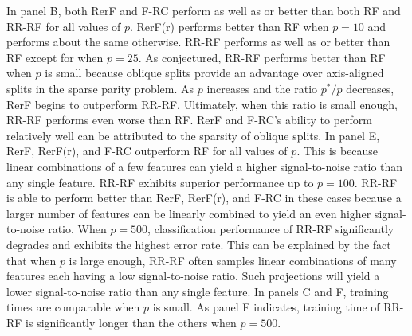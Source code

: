 In panel B, both RerF and F-RC perform as well as or better than both RF and RR-RF for all values of $p$. RerF(r) performs better than RF when $p = 10$ and performs about the same otherwise. RR-RF performs as well as or better than RF except for when $p = 25$. As conjectured, RR-RF performs better than RF when $p$ is small because oblique splits provide an advantage over axis-aligned splits in the sparse parity problem. As $p$ increases and the ratio $p^*/p$ decreases, RerF begins to outperform RR-RF. Ultimately, when this ratio is small enough, RR-RF performs even worse than RF. RerF and F-RC's ability to perform relatively well can be attributed to the sparsity of oblique splits. In panel E, RerF, RerF(r), and F-RC outperform RF for all values of $p$. This is because linear combinations of a few features can yield a higher signal-to-noise ratio than any single feature. RR-RF exhibits superior performance up to $p = 100$. RR-RF is able to perform better than RerF, RerF(r), and F-RC in these cases because a larger number of features can be linearly combined to yield an even higher signal-to-noise ratio. When $p = 500$, classification performance of RR-RF significantly degrades and exhibits the highest error rate. This can be explained by the fact that when $p$ is large enough, RR-RF often samples linear combinations of many features each having a low signal-to-noise ratio. Such projections will yield a lower signal-to-noise ratio than any single feature. In panels C and F, training times are comparable when $p$ is small. As panel F indicates, training time of RR-RF is significantly longer than the others when $p = 500$.

